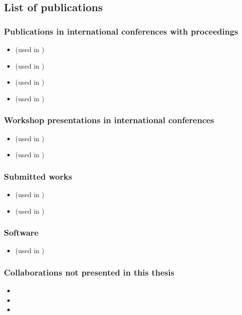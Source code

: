 \subsection*{List of publications}

\subsubsection*{Publications in international conferences with proceedings}

\begin{itemize}
	\item {} (used in )
	\item {} (used in )
	\item {} (used in )
	\item {} (used in )
\end{itemize}

\subsubsection*{Workshop presentations in international conferences}

\begin{itemize}
	\item {} (used in )
	\item {} (used in )
\end{itemize}

\subsubsection*{Submitted works}

\begin{itemize}
	\item {} (used in )
	\item {} (used in )
\end{itemize}

\subsubsection*{Software}

\begin{itemize}
	\item {} (used in )
\end{itemize}

\subsubsection*{Collaborations not presented in this thesis}

\begin{itemize}
	\item {}
	\item {}
	\item {}
\end{itemize}